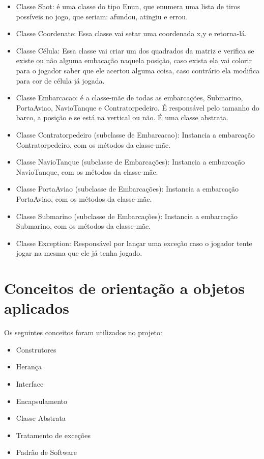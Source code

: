 \documentclass[]{article}
\begin{document}
\begin{itemize}
    \item Classe Shot: é uma classe do tipo Enun, que enumera uma lista de tiros possíveis no jogo, que seriam: afundou, atingiu e errou.
    \item Classe Coordenate: Essa classe vai setar uma coordenada x,y e retorna-lá.
	\item Classe Célula: Essa classe vai criar um dos quadrados da matriz e verifica se existe ou não alguma embacação naquela posição, caso exista ela vai colorir para o jogador saber que ele acertou alguma coisa, caso contrário ela modifica para cor de célula já jogada.
	\item Classe Embarcacao: é a classe-mãe de todas as embarcações, Submarino, PortaAviao, NavioTanque e Contratorpedeiro. É responsável pelo tamanho do barco, a posição e se está na vertical ou não. É uma classe abstrata. 	\item Classe Contratorpedeiro (subclasse de Embarcacao): Instancia a embarcação Contratorpedeiro, com os métodos da classe-mãe.
	\item Classe NavioTanque (subclasse de Embarcações): Instancia a embarcação NavioTanque, com os métodos da classe-mãe.
	\item Classe PortaAviao (subclasse de Embarcações): Instancia a embarcação PortaAviao, com os métodos da classe-mãe.
	\item Classe Submarino (subclasse de Embarcações): Instancia a embarcação Submarino, com os métodos da classe-mãe.
	\item Classe Exception: Responsável por lançar uma exceção caso o jogador tente jogar na mesma que ele já tenha jogado.
\end{itemize}

\section{Conceitos de orientação a objetos aplicados}
Os seguintes conceitos foram utilizados no projeto:

\begin{itemize}
	\item Construtores
	\item Herança
	\item Interface
	\item Encapsulamento
    \item Classe Abstrata
	\item Tratamento de exceções
    \item Padrão de Software
\end{itemize}
\end{document}
